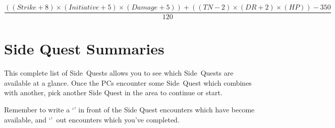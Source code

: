 \begin{equation}
\frac{(( Strike + 8 ) \times ( Initiative + 5) \times ( Damage + 5 ) ) + ( ( TN -2 ) \times ( DR + 2 ) \times ( HP )) - 350}{120}
\end{equation}

\chapter{Side Quest Summaries}
\label{sqSummaries}



\newpage
{}

\vspace{5em}
\begin{multicols}{2}

\noindent
This complete list of Side~Quests allows you to see which Side~Quests are available at a glance.
Once the PCs encounter some Side~Quest which combines with another, pick another Side Quest in the area to continue or start.

Remember to write a `' in front of the Side Quest encounters which have become available, and `'~out encounters which you've completed.

\end{multicols}

